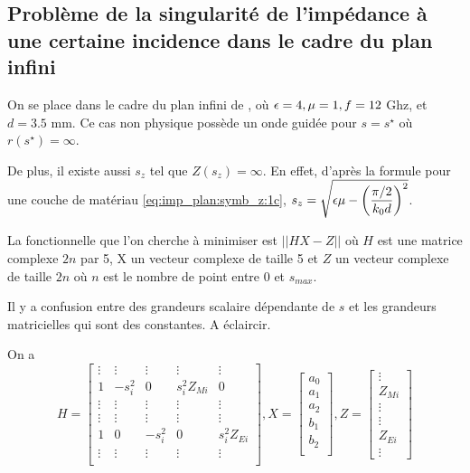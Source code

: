 \subsection{Problème de la singularité de l'impédance à une certaine incidence dans le cadre du plan infini}
On se place dans le cadre du plan infini de \cite{soudais_3d_2017}, où \(\epsilon=4,\mu=1,f=12\) Ghz, et \(d=3.5\) mm. Ce cas non physique possède un onde guidée pour \(s=s^\star\) où \(r(s^\star) = \infty\).

De plus, il existe aussi \(s_z\) tel que \(Z(s_z) = \infty\). En effet, d'après la formule pour une couche de matériau \eqref{eq:imp_plan:symb_z:1c}, \(s_z = \sqrt{\epsilon \mu - \left(\dfrac{\pi/2}{k_0 d}\right)^2}\).

La fonctionnelle que l'on cherche à minimiser est \(||H X - Z||\) où \(H\) est une matrice complexe \(2n\) par 5, X un vecteur complexe de taille 5 et \(Z\) un vecteur complexe de taille \(2n\) où \(n\) est le nombre de point entre 0 et \(s_{max}\).

\begin{TODO}
  Il y a confusion entre des grandeurs scalaire dépendante de \(s\) et les grandeurs matricielles qui sont des constantes. A éclaircir.
\end{TODO}

On a
\[
  H = \begin{bmatrix}
  \vdots & \vdots & \vdots & \vdots &\vdots \\
  1 & -s_i^2 & 0 & s_i^2 Z_{Mi} & 0 \\
  \vdots & \vdots & \vdots & \vdots &\vdots \\
  \vdots & \vdots & \vdots & \vdots &\vdots \\
  1 & 0 &-s_i^2 & 0 & s_i^2 Z_{Ei} \\
  \vdots & \vdots & \vdots & \vdots &\vdots \\
  \end{bmatrix},
  X = \begin{bmatrix}
  a_0\\
  a_1\\
  a_2\\
  b_1\\
  b_2\\
  \end{bmatrix},
  Z=\begin{bmatrix}
  \vdots\\
  Z_{Mi}\\
  \vdots\\
  \vdots\\
  Z_{Ei}\\
  \vdots
  \end{bmatrix}
\]

